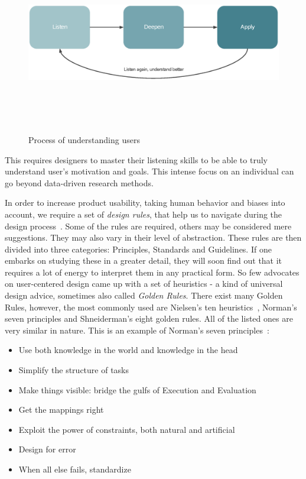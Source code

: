 \begin{figure}[htb]
\begin{center}
  \includegraphics*[width=14cm,height=8cm,keepaspectratio]{images/ldap}
\end{center}
\caption{Process of understanding users}
\label{img:ldap}
\end{figure}

This requires designers to master their listening skills to be able to truly understand user’s motivation and goals. This intense focus on an individual can go beyond data-driven research methods.

In order to increase product usability, taking human behavior and biases into account, we require a set of {\it design rules}, that help us to navigate during the design process~\cite{Dix}. Some of the rules are required, others may be considered mere suggestions. They may also vary in their level of abstraction. These rules are then divided into three categories: Principles, Standards and Guidelines. If one embarks on studying these in a greater detail, they will soon find out that it requires a lot of energy to interpret them in any practical form. So few advocates on user-centered design came up with a set of heuristics - a kind of universal design advice, sometimes also called {\it Golden Rules}. There exist many Golden Rules, however, the most commonly used are Nielsen’s ten heuristics~\cite{Nielsen}, Norman’s seven principles and Shneiderman’s eight golden rules. All of the listed ones are very similar in nature. This is an example of Norman’s seven principles~\cite{Norman}:

\begin{itemize}
\item Use both knowledge in the world and knowledge in the head
\item Simplify the structure of tasks
\item Make things visible:  bridge the gulfs of Execution and Evaluation
\item Get the mappings right
\item Exploit the power of constraints, both natural and artificial
\item Design for error
\item When all else fails, standardize
\end{itemize}


